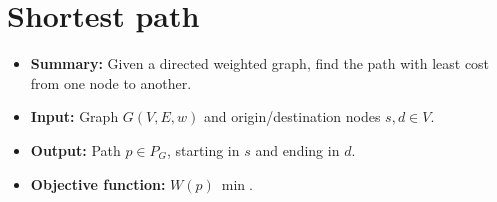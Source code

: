 \section{Shortest path} \label{algorithm-shortestpath}
\begin{itemize}
    \item \textbf{Summary:} Given a directed weighted graph, find the path with least cost from one node to another.
    \item \textbf{Input:} Graph $G(V,E,w)$ and origin/destination nodes $s, d \in V$.
    \item \textbf{Output:} Path $p \in P_G$, starting in $s$ and ending in $d$.
    \item \textbf{Objective function:} $W(p)~\min$.
\end{itemize}



